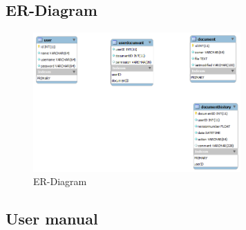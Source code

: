 \documentclass[11pt]{article}
\begin{document}
\subsection{ER-Diagram}
\label{sec-3-3}
\begin{figure}[H]
  		\centering
    	\includegraphics[width=300px]{images/New ER database.png}
    	\caption{ER-Diagram}
\end{figure}
\subsection{User manual}
\label{sec-3-4}
\end{document}
